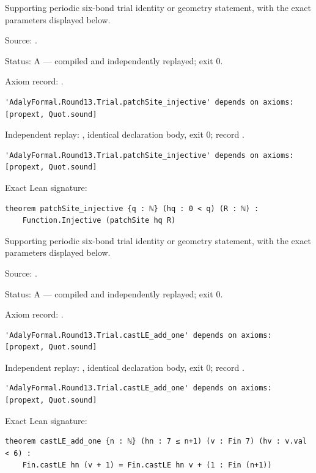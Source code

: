 \begin{theorem}[bp-344]
\label{bp-344}
\leanok
Supporting periodic six-bond trial identity or geometry statement, with the exact parameters displayed below.

\par Source: \texttt{}.
\par Status: A — compiled and independently replayed; exit 0.
\par Axiom record: \texttt{}.
\begin{verbatim}
'AdalyFormal.Round13.Trial.patchSite_injective' depends on axioms: [propext, Quot.sound]
\end{verbatim}
\par Independent replay: \texttt{}, identical declaration body, exit 0; record \texttt{}.
\begin{verbatim}
'AdalyFormal.Round13.Trial.patchSite_injective' depends on axioms: [propext, Quot.sound]
\end{verbatim}
\par Exact Lean signature:
\begin{verbatim}
theorem patchSite_injective {q : ℕ} (hq : 0 < q) (R : ℕ) :
    Function.Injective (patchSite hq R)
\end{verbatim}
\end{theorem}

\begin{theorem}[bp-345]
\label{bp-345}
\uses{}
\leanok
Supporting periodic six-bond trial identity or geometry statement, with the exact parameters displayed below.

\par Source: \texttt{}.
\par Status: A — compiled and independently replayed; exit 0.
\par Axiom record: \texttt{}.
\begin{verbatim}
'AdalyFormal.Round13.Trial.castLE_add_one' depends on axioms: [propext, Quot.sound]
\end{verbatim}
\par Independent replay: \texttt{}, identical declaration body, exit 0; record \texttt{}.
\begin{verbatim}
'AdalyFormal.Round13.Trial.castLE_add_one' depends on axioms: [propext, Quot.sound]
\end{verbatim}
\par Exact Lean signature:
\begin{verbatim}
theorem castLE_add_one {n : ℕ} (hn : 7 ≤ n+1) (v : Fin 7) (hv : v.val < 6) :
    Fin.castLE hn (v + 1) = Fin.castLE hn v + (1 : Fin (n+1))
\end{verbatim}
\end{theorem}

